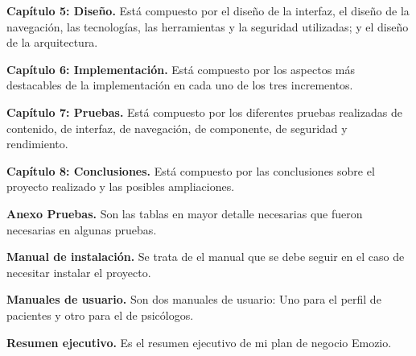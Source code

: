 \textbf{Capítulo 5: Diseño.} Está compuesto por el diseño de la interfaz, el diseño de la navegación, las tecnologías, las herramientas y la seguridad utilizadas; y  el diseño de la arquitectura.\newline


\textbf{Capítulo 6: Implementación.} Está compuesto por los aspectos más destacables de la implementación en cada uno de los tres incrementos.\newline


\textbf{Capítulo 7: Pruebas.} Está compuesto por los diferentes pruebas realizadas de contenido, de interfaz, de navegación, de componente, de seguridad y rendimiento.\newline


\textbf{Capítulo 8: Conclusiones.} Está compuesto por las conclusiones sobre el proyecto realizado y las posibles ampliaciones.\newline


\textbf{Anexo Pruebas.} Son las tablas en mayor detalle necesarias que fueron necesarias en algunas pruebas.\newline


\textbf{Manual de instalación.} Se trata de el manual que se debe seguir en el caso de necesitar instalar el proyecto.\newline


\textbf{Manuales de usuario.} Son dos manuales de usuario: Uno para el perfil de pacientes y otro para el de psicólogos.\newline


\textbf{Resumen ejecutivo.} Es el resumen ejecutivo de mi plan de negocio Emozio.\newline